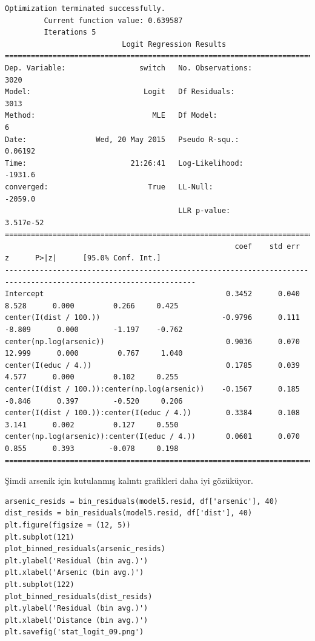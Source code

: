 \documentclass[12pt,fleqn]{article}\usepackage{../../common}
\begin{document}
\begin{verbatim}
Optimization terminated successfully.
         Current function value: 0.639587
         Iterations 5
                           Logit Regression Results                           
==============================================================================
Dep. Variable:                 switch   No. Observations:                 3020
Model:                          Logit   Df Residuals:                     3013
Method:                           MLE   Df Model:                            6
Date:                Wed, 20 May 2015   Pseudo R-squ.:                 0.06192
Time:                        21:26:41   Log-Likelihood:                -1931.6
converged:                       True   LL-Null:                       -2059.0
                                        LLR p-value:                 3.517e-52
==================================================================================================================
                                                     coef    std err          z      P>|z|      [95.0% Conf. Int.]
------------------------------------------------------------------------------------------------------------------
Intercept                                          0.3452      0.040      8.528      0.000         0.266     0.425
center(I(dist / 100.))                            -0.9796      0.111     -8.809      0.000        -1.197    -0.762
center(np.log(arsenic))                            0.9036      0.070     12.999      0.000         0.767     1.040
center(I(educ / 4.))                               0.1785      0.039      4.577      0.000         0.102     0.255
center(I(dist / 100.)):center(np.log(arsenic))    -0.1567      0.185     -0.846      0.397        -0.520     0.206
center(I(dist / 100.)):center(I(educ / 4.))        0.3384      0.108      3.141      0.002         0.127     0.550
center(np.log(arsenic)):center(I(educ / 4.))       0.0601      0.070      0.855      0.393        -0.078     0.198
==================================================================================================================
\end{verbatim}

Şimdi arsenik için kutulanmış kalıntı grafikleri daha iyi gözüküyor.

\begin{verbatim}
arsenic_resids = bin_residuals(model5.resid, df['arsenic'], 40)
dist_resids = bin_residuals(model5.resid, df['dist'], 40)
plt.figure(figsize = (12, 5))
plt.subplot(121)
plot_binned_residuals(arsenic_resids)
plt.ylabel('Residual (bin avg.)')
plt.xlabel('Arsenic (bin avg.)')
plt.subplot(122)
plot_binned_residuals(dist_resids)
plt.ylabel('Residual (bin avg.)')
plt.xlabel('Distance (bin avg.)')
plt.savefig('stat_logit_09.png')
\end{verbatim}
\end{document}
